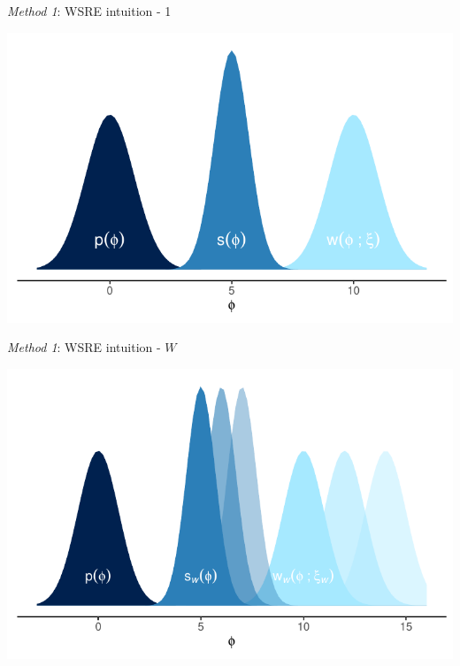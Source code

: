 \documentclass[10pt,ignorenonframetext,]{beamer}
\newcommand{\Nw}{W}
\begin{document}
\begin{frame}{\emph{Method 1}: WSRE intuition - 1}

\begin{center}\includegraphics[width=1\linewidth]{figures/weighted-dist-plot} \end{center}

\end{frame}

\begin{frame}{\emph{Method 1}: WSRE intuition - \(\Nw\)}

\begin{center}\includegraphics[width=1\linewidth]{figures/weighted-dist-plot-many} \end{center}

\end{frame}
\end{document}
